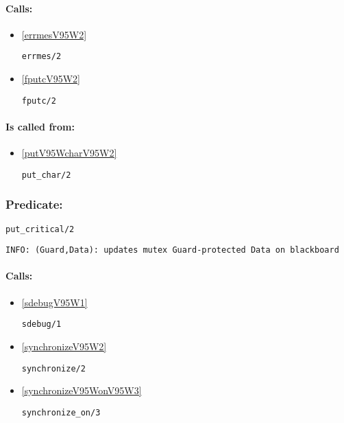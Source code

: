 \paragraph{Calls:} 
\begin{itemize}
\item \ref{errmesV95W2} 
\begin{verbatim}
errmes/2
\end{verbatim}

\item \ref{fputcV95W2} 
\begin{verbatim}
fputc/2
\end{verbatim}

\end{itemize}
\paragraph{Is called from:} 
\begin{itemize}
\item \ref{putV95WcharV95W2} 
\begin{verbatim}
put_char/2
\end{verbatim}

\end{itemize}

\subsubsection{Predicate:} \label{putV95WcriticalV95W2}

\begin{verbatim}
put_critical/2
\end{verbatim}

{\small \begin{verbatim}
INFO: (Guard,Data): updates mutex Guard-protected Data on blackboard

\end{verbatim}}
\paragraph{Calls:} 
\begin{itemize}
\item \ref{sdebugV95W1} 
\begin{verbatim}
sdebug/1
\end{verbatim}

\item \ref{synchronizeV95W2} 
\begin{verbatim}
synchronize/2
\end{verbatim}

\item \ref{synchronizeV95WonV95W3} 
\begin{verbatim}
synchronize_on/3
\end{verbatim}

\end{itemize}

